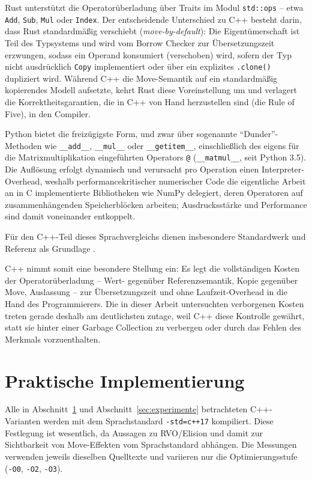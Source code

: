 \documentclass[10pt,a4paper]{article}
\begin{document}
Rust unterstützt die Operatorüberladung über Traits im Modul
\texttt{std::ops} -- etwa \texttt{Add}, \texttt{Sub}, \texttt{Mul} oder
\texttt{Index}. Der entscheidende Unterschied zu C++ besteht darin,
dass Rust standardmäßig verschiebt (\emph{move-by-default}): Die
Eigentümerschaft ist Teil des Typsystems und wird vom Borrow Checker
zur Übersetzungszeit erzwungen, sodass ein Operand konsumiert
(verschoben) wird, sofern der Typ nicht ausdrücklich \texttt{Copy}
implementiert oder über ein explizites \texttt{.clone()} dupliziert
wird. Während C++ die Move-Semantik auf ein standardmäßig kopierendes
Modell aufsetzte, kehrt Rust diese Voreinstellung um und verlagert die
Korrektheitsgarantien, die in C++ von Hand herzustellen sind (die Rule
of Five), in den Compiler.

Python bietet die freizügigste Form, und zwar über sogenannte
``Dunder''-Methoden wie \texttt{\_\_add\_\_}, \texttt{\_\_mul\_\_}
oder \texttt{\_\_getitem\_\_}, einschließlich des eigens für die
Matrixmultiplikation eingeführten Operators \texttt{@}
(\texttt{\_\_matmul\_\_}, seit Python 3.5). Die Auflösung erfolgt
dynamisch und verursacht pro Operation einen Interpreter-Overhead,
weshalb performancekritischer numerischer Code die eigentliche Arbeit
an in C implementierte Bibliotheken wie NumPy delegiert, deren
Operatoren auf zusammenhängenden Speicherblöcken arbeiten;
Ausdrucksstärke und Performance sind damit voneinander entkoppelt.

Für den C++-Teil dieses Sprachvergleichs dienen insbesondere Standardwerk und Referenz als Grundlage \cite{stroustrup2013,cppreference}.

C++ nimmt somit eine besondere Stellung ein: Es legt die vollständigen
Kosten der Operatorüberladung -- Wert- gegenüber Referenzsemantik,
Kopie gegenüber Move, Auslassung -- zur Übersetzungszeit und ohne
Laufzeit-Overhead in die Hand des Programmierers. Die in dieser Arbeit
untersuchten verborgenen Kosten treten gerade deshalb am deutlichsten
zutage, weil C++ diese Kontrolle gewährt, statt sie hinter einer
Garbage Collection zu verbergen oder durch das Fehlen des Merkmals
vorzuenthalten.

\section{Praktische Implementierung}
\label{sec:implementierung}

Alle in Abschnitt~\ref{sec:implementierung} und Abschnitt~\ref{sec:experimente}
betrachteten C++-Varianten werden mit dem Sprachstandard \texttt{-std=c++17}
kompiliert. Diese Festlegung ist wesentlich, da Aussagen zu RVO/Elision und
damit zur Sichtbarkeit von Move-Effekten vom Sprachstandard abhängen. Die
Messungen verwenden jeweils dieselben Quelltexte und variieren nur die
Optimierungsstufe (\texttt{-O0}, \texttt{-O2}, \texttt{-O3}).
\end{document}
